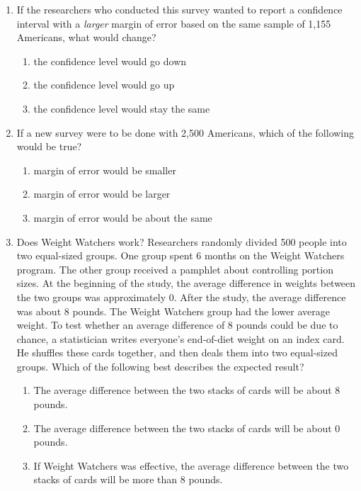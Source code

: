 \documentclass[11pt]{article}
\newcommand{\solnMult}[1]{ #1 }
\begin{document}
\begin{enumerate}
%

\item If the researchers who conducted this survey wanted to report a confidence interval with a \emph{larger} 
margin of error based on the same sample of 1,155 Americans, what would change?
\begin{enumerate}
\item the confidence level would go down
\item \solnMult{the confidence level would go up}
\item the confidence level would stay the same \\
\end{enumerate}

%

\item \label{relaxL} If a new survey were to be done with 2,500 Americans, which of the following would be true?
\begin{enumerate}
\item \solnMult{margin of error would be smaller}
\item margin of error would be larger
\item margin of error would be about the same
\end{enumerate}


\pagebreak

\item Does Weight Watchers work? Researchers randomly divided 500 people into two equal-sized groups. One 
group spent 6 months on the Weight Watchers program. The other group received a pamphlet about controlling portion 
sizes. At the beginning of the study, the average difference in weights between the two groups was approximately 0. After 
the study, the average difference was about 8 pounds. The Weight Watchers group had the lower average weight. To 
test whether an average difference of 8 pounds could be due to chance, a statistician writes everyone's end-of-diet 
weight on an index card. He shuffles these cards together, and then deals them into two equal-sized groups. Which of 
the following best describes the expected result?

\begin{enumerate}
\item The average difference between the two stacks of cards will be about 8 pounds.
\item \solnMult{The average difference between the two stacks of cards will be about 0 pounds.}
\item If Weight Watchers was effective, the average difference between the two stacks of cards will be more than 8 pounds. \\
\end{enumerate}


\end{enumerate}
\end{document}
